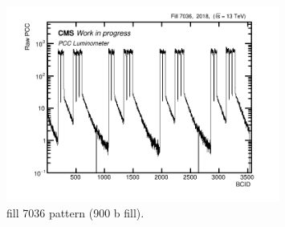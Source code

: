 \newpage
\begin{figure}[H]
\centering
\includegraphics[width=0.8\textwidth]{ashish_thesis/fill_7036_pattern_2.png}
\caption[7036 fill patern]{%
  fill 7036 pattern (900 b fill).
}
\label{fig:af_fit40}
\end{figure}

